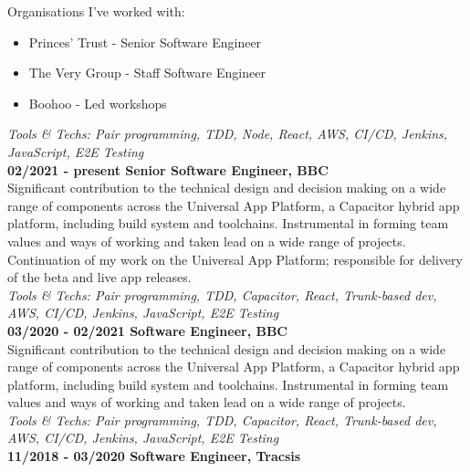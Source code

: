 Organisations I've worked with:\\

\begin{itemize}
  \item Princes' Trust - Senior Software Engineer
  \item The Very Group - Staff Software Engineer
  \item Boohoo - Led workshops
\end{itemize}

\emph{Tools \& Techs: Pair programming, TDD, Node, React, AWS, CI/CD, Jenkins, JavaScript, E2E Testing}\\

\textbf{02/2021 - present \hspace{2.75em}Senior Software Engineer, BBC}\\

Significant contribution to the technical design and decision making on a wide range of components across the Universal App Platform, a Capacitor hybrid app platform, including build system and toolchains. Instrumental in forming team values and ways of working and taken lead on a wide range of projects.\\

Continuation of my work on the Universal App Platform; responsible for delivery of the beta and live app releases.\\

\emph{Tools \& Techs: Pair programming, TDD, Capacitor, React, Trunk-based dev, AWS, CI/CD, Jenkins, JavaScript, E2E Testing}\\

\textbf{03/2020 - 02/2021 \hspace{2.75em}Software Engineer, BBC}\\

Significant contribution to the technical design and decision making on a wide range of components across the Universal App Platform, a Capacitor hybrid app platform, including build system and toolchains. Instrumental in forming team values and ways of working and taken lead on a wide range of projects.\\

\emph{Tools \& Techs: Pair programming, TDD, Capacitor, React, Trunk-based dev, AWS, CI/CD, Jenkins, JavaScript, E2E Testing}\\

\textbf{11/2018 - 03/2020 \hspace{2.75em}Software Engineer, Tracsis}\\

